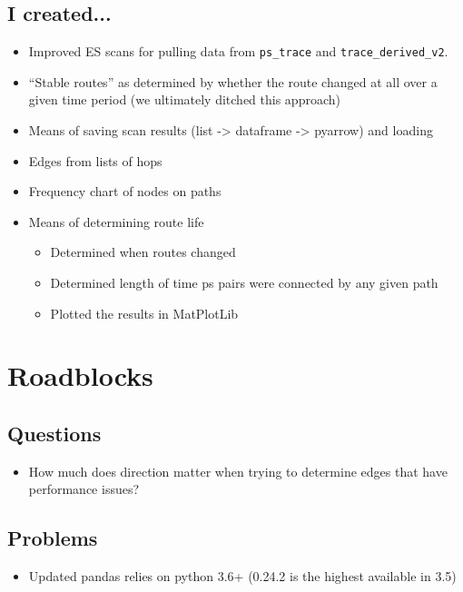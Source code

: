 \documentclass{weeklyreport}
\begin{document}
\subsection*{I created...}
\begin{itemize}
	\item Improved ES scans for pulling data from \texttt{ps\_trace} and \texttt{trace\_derived\_v2}.
	\item “Stable routes” as determined by whether the route changed at all over a given time period (we ultimately ditched this approach)
	\item Means of saving scan results (list -> dataframe -> pyarrow) and loading
	\item Edges from lists of hops
	\item Frequency chart of nodes on paths
	\item Means of determining route life
	\begin{itemize}
		\item Determined when routes changed
		\item Determined length of time ps pairs were connected by any given path
		\item Plotted the results in MatPlotLib
	\end{itemize}

\end{itemize}

\pagebreak
\section*{Roadblocks}

\subsection*{Questions}

\begin{itemize}
	\item How much does direction matter when trying to determine edges that have performance issues?
\end{itemize}

\subsection*{Problems}

\begin{itemize}
	\item Updated pandas relies on python 3.6+ (0.24.2 is the highest available in 3.5)
\end{itemize}
\end{document}
